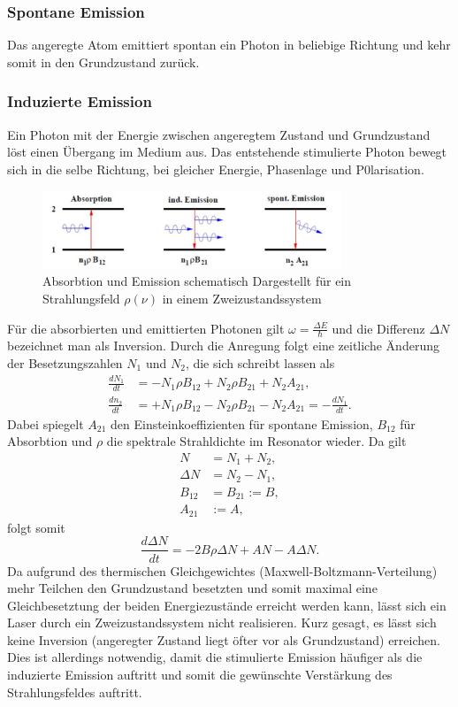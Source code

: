 \subsubsection*{Spontane Emission}
Das angeregte Atom emittiert spontan ein Photon in beliebige Richtung und kehr somit in den Grundzustand zurück.
\subsubsection*{Induzierte Emission}
Ein Photon mit der Energie zwischen angeregtem Zustand und Grundzustand löst einen Übergang im Medium aus. Das entstehende stimulierte Photon
bewegt sich in die selbe Richtung, bei gleicher Energie, Phasenlage und P0larisation.

\begin{figure}
    \center
    \includegraphics[width=0.8\textwidth]{bilder/3wege.jpg}
    \caption{Absorbtion und Emission schematisch Dargestellt für ein Strahlungsfeld $\rho(\nu)$ in einem Zweizustandssystem \cite{anleitung}}
    \label{fig:3wege}
\end{figure}
\label{sec:theorie}

Für die absorbierten und emittierten Photonen gilt $\omega=\frac{\Delta E}{\hbar}$ und die Differenz $\Delta N$ bezeichnet man als Inversion.
Durch die Anregung folgt eine zeitliche Änderung der Besetzungszahlen $N_1$ und $N_2$, die sich schreibt lassen als
\begin{align}
    \frac{dN_1}{dt}&=-N_1\rho B_{12}+N_2\rho B_{21} + N_2 A_{21},\\
    \frac{dn_2}{dt}&=+N_1\rho B_{12}-N_2\rho B_{21} - N_2 A_{21}= -\frac{dN_1}{dt}.
\end{align}
Dabei spiegelt $A_{21}$ den Einsteinkoeffizienten für spontane Emission, $B_{12}$ für Absorbtion und $\rho$ die spektrale Strahldichte im Resonator wieder.
Da gilt
\begin{align}
    N&=N_1+N_2{,}\\
    \Delta N &= N_2-N_1{,}\\
    B_{12}&=B_{21}:=B{,}\\
    A_{21}&:=A{,}   
\end{align}
folgt somit
\begin{equation}
    \frac{d\Delta N}{dt}=-2B\rho\Delta N + AN-A\Delta N.
\end{equation}
Da aufgrund des thermischen Gleichgewichtes (Maxwell-Boltzmann-Verteilung) mehr Teilchen den Grundzustand besetzten und somit maximal eine 
Gleichbesetztung der beiden Energiezustände erreicht werden kann, lässt sich ein Laser durch ein Zweizustandssystem nicht realisieren. Kurz gesagt,
es lässt sich keine Inversion (angeregter Zustand liegt öfter vor als Grundzustand) erreichen.
Dies ist allerdings notwendig, damit die stimulierte Emission häufiger als die induzierte Emission auftritt und somit die gewünschte Verstärkung des Strahlungsfeldes auftritt.

